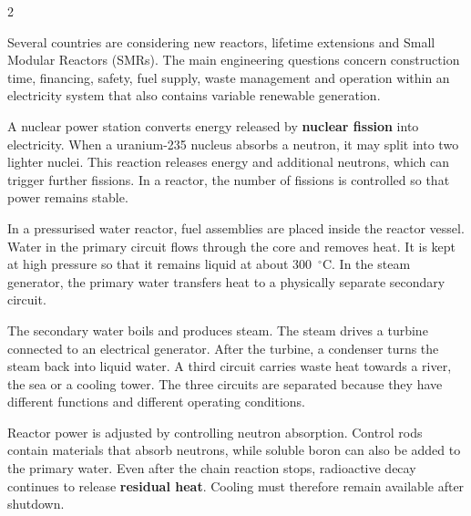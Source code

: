 

\begin{multicols}{2}

\begin{engineeringnews}
Several countries are considering new reactors, lifetime extensions and Small Modular
Reactors (SMRs). The main engineering questions concern construction time, financing,
safety, fuel supply, waste management and operation within an electricity system that also
contains variable renewable generation.
\end{engineeringnews}

\begin{ecarticle}
A nuclear power station converts energy released by \textbf{nuclear fission} into electricity.
When a uranium-235 nucleus absorbs a neutron, it may split into two lighter nuclei. This
reaction releases energy and additional neutrons, which can trigger further fissions. In a
reactor, the number of fissions is controlled so that power remains stable.

In a pressurised water reactor, fuel assemblies are placed inside the reactor vessel. Water
in the primary circuit flows through the core and removes heat. It is kept at high pressure
so that it remains liquid at about 300~$^{\circ}$C. In the steam generator, the primary water
transfers heat to a physically separate secondary circuit.

The secondary water boils and produces steam. The steam drives a turbine connected to an
electrical generator. After the turbine, a condenser turns the steam back into liquid water.
A third circuit carries waste heat towards a river, the sea or a cooling tower. The three
circuits are separated because they have different functions and different operating
conditions.

Reactor power is adjusted by controlling neutron absorption. Control rods contain materials
that absorb neutrons, while soluble boron can also be added to the primary water. Even after
the chain reaction stops, radioactive decay continues to release \textbf{residual heat}.
Cooling must therefore remain available after shutdown.


\end{ecarticle}
\end{multicols}
